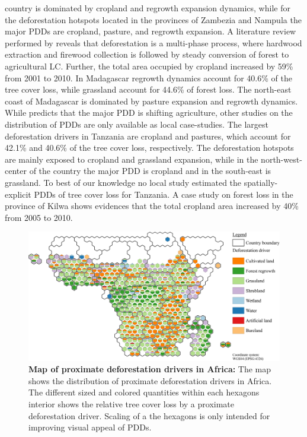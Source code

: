 country is dominated by cropland and regrowth expansion dynamics, while for the deforestation hotspots located in the provinces of Zambezia and Nampula the major \acp{PDD} are cropland, pasture, and regrowth expansion. A literature review performed by \citet{Sitoe2012} reveals that deforestation is a multi-phase process, where hardwood extraction and firewood collection is followed by steady conversion of forest to agricultural \ac{LC}. Further, the total area occupied by cropland increased by 59\% from 2001 to 2010. In Madagascar regrowth dynamics account for 40.6\% of the tree cover loss, while grassland account for 44.6\% of forest loss. The north-east coast of Madagascar is dominated by pasture expansion and regrowth dynamics. While \citet{Curtis2018} predicts that the major \ac{PDD} is shifting agriculture, other studies on the distribution of \acp{PDD} are only available as local case-studies. The largest deforestation drivers in Tanzania are cropland and pastures, which account for 42.1\% and 40.6\% of the tree cover loss, respectively. The deforestation hotspots are mainly exposed to cropland and grassland expansion, while in the north-west-center of the country the major \ac{PDD} is cropland and in the south-east is grassland. To best of our knowledge no local study estimated the spatially-explicit \acp{PDD} of tree cover loss for Tanzania. A case study on forest loss in the province of Kilwa shows evidences that the total cropland area increased by 40\% from 2005 to 2010.
			\begin{figure}[ht]
				\centering
				\includegraphics[scale=1]{img/africa_driver_frameless}
				\caption[Map of proximate deforestion drivers in Africa]{\textbf{Map of proximate deforestation drivers in Africa:} The map shows the distribution of proximate deforestation drivers in Africa. The different sized and colored quantities within each hexagons interior shows the relative tree cover loss by a proximate deforestation driver. Scaling of a the hexagons is only intended for improving visual appeal of \acp{PDD}.}
				\label{fig:africa_driver}
			\end{figure}

